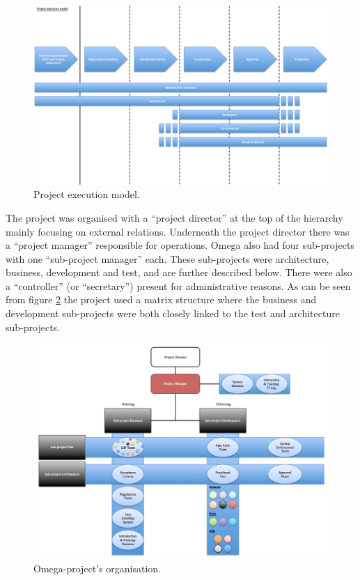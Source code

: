 \begin{figure}[H]
\centering
\includegraphics[trim = 0mm 0mm 0mm 0mm,width=155mm]{images/execution_model.png}
\caption{Project execution model.}
\label{project_execution}
\end{figure}

The project was organised with a ``project director'' at the top of the hierarchy mainly focusing on external relations. Underneath the project director there was a ``project manager'' responsible for operations. Omega also had four sub-projects with one ``sub-project manager'' each. These sub-projects were architecture, business, development and test, and are further described below. There were also a ``controller'' (or ``secretary'') present for administrative reasons. As can be seen from figure \ref{omega} the project used a matrix structure where the business and development sub-projects were both closely linked to the test and architecture sub-projects.

\begin{figure}[H]
\centering
\includegraphics[trim = 0mm 0mm 0mm 0mm,width=155mm]{images/omega_organisation.png}
\caption{Omega-project's organisation.}
\label{omega}
\end{figure}

